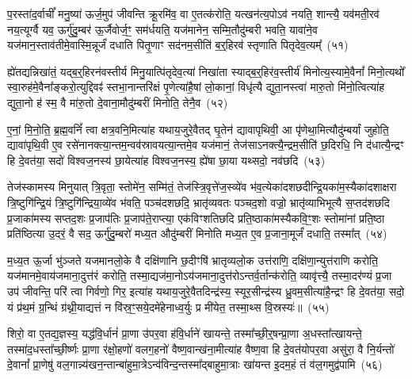 प॒रस्ता॑द॒र्वाचीं᳚ मनु॒ष्या॑ ऊर्ज॒मुप॑ जीवन्ति क्रू॒रमि॑व॒ वा ए॒तत्क॑रोति॒ यत्खन॑त्य॒पो\-ऽव॑ नयति॒ शान्त्यै॒ यव॑मती॒रव॑ नय॒त्यूर्ग्वै यव॒ ऊर्गु॑दु॒म्बर॑ ऊ॒र्जैवोर्ज॒ꣳ॒ सम॑र्धयति॒ यज॑मानेन॒ सम्मि॒तौदु॑म्बरी भवति॒ यावा॑ने॒व यज॑मान॒स्ताव॑तीमे॒वास्मि॒न्नूर्जं॑ दधाति पितृ॒णाꣳ सद॑नम॒सीति॑ ब॒र्॒\mbox{}हिरव॑ स्तृणाति पितृदेव॒त्यम्᳚~(५१)\ip

ह्ये॑तद्यन्निखा॑तं॒ यद्ब॒र्॒\mbox{}हिरन॑वस्तीर्य मिनु॒यात्पि॑तृदेव॒त्या॑ निखा॑ता स्याद्ब॒र्॒\mbox{}हिर॑व॒स्तीर्य॑ मिनोत्य॒स्यामे॒वैनां᳚ मिनो॒त्यथो᳚ स्वा॒रुह॑मे॒वैना᳚ङ्करो॒त्युद्दिवꣴ॑ स्तभा॒नान्तरि॑क्षं पृ॒णेत्या॑है॒षां लो॒कानां॒ विधृ॑त्यै द्युता॒नस्त्वा॑ मारु॒तो मि॑नो॒त्वित्या॑ह द्युता॒नो ह॑ स्म॒ वै मा॑रु॒तो दे॒वाना॒मौदु॑म्बरीं मिनोति॒ तेनै॒व~(५२)\ip

ए॒नां॒ मि॒नो॒ति॒ ब्र॒ह्म॒वनिं᳚ त्वा क्षत्र॒वनि॒मित्या॑ह यथाय॒जुरे॒वैतद् घृ॒तेन॑ द्यावा\-पृथिवी॒ आ पृ॑णेथा॒मित्यौदु॑म्बर्यां जुहोति॒ द्यावा॑\-पृथि॒वी ए॒व रसे॑नानक्त्या॒न्तम॒न्वव॑स्रावयत्या॒न्तमे॒व यज॑मानं॒ तेज॑सा\-ऽनक्त्यै॒न्द्रम॒सीति॑ छ॒दिरधि॒ नि द॑धात्यै॒न्द्रꣳ हि दे॒वत॑या॒ सदो॑ विश्वज॒नस्य॑ छा॒येत्या॑ह विश्वज॒नस्य॒ ह्ये॑षा छा॒या यथ्सदो॒ नव॑छदि~(५३)\ip

तेज॑स्कामस्य मिनुयात् त्रि॒वृता॒ स्तोमे॑न॒ सम्मि॑तं॒ तेज॑स्त्रि॒वृत्\-ते॑ज॒स्व्ये॑व भ॑व॒त्येका॑\-दशछदीन्द्रि॒यका॑म॒स्यैका॑\-दशाक्षरा त्रि॒ष्टुगि॑न्द्रि॒यं त्रि॒ष्टुगि॑न्द्रिया॒व्ये॑व भ॑वति॒ पञ्च॑दशछदि॒ भ्रातृ॑व्यवतः पञ्चद॒शो वज्रो॒ भ्रातृ॑व्याभिभूत्यै स॒प्तद॑शछदि प्र॒जाका॑मस्य सप्तद॒शः प्र॒जा\-प॑तिः प्र॒जा\-प॑ते॒राप्त्या॒ एक॑विꣳशतिछदि प्रति॒ष्ठाका॑मस्यैकवि॒ꣳ॒शः स्तोमा॑नां प्रति॒ष्ठा प्रति॑ष्ठित्या उ॒दरं॒ वै सद॒ ऊर्गु॑दु॒म्बरो॑ मध्य॒त औदु॑म्बरीं मिनोति मध्य॒त ए॒व प्र॒जाना॒मूर्जं॑ दधाति॒ तस्मा᳚त्~(५४)\ip

म॒ध्य॒त ऊ॒र्जा भु॑ञ्जते यजमानलो॒के वै दक्षि॑णानि छ॒दीꣳषि॑ भ्रातृव्यलो॒क उत्त॑राणि॒ दक्षि॑णा॒न्युत्त॑राणि करोति॒ यज॑मानमे॒वाय॑जमाना॒दुत्त॑रं करोति॒ तस्मा॒द्यज॑मा॒नो\-ऽय॑जमाना॒दुत्त॑रो\-ऽन्तर्व॒र्तान्क॑रोति॒ व्यावृ॑त्त्यै॒ तस्मा॒दर॑ण्यं प्र॒जा उप॑ जीवन्ति॒ परि॑ त्वा गिर्वणो॒ गिर॒ इत्या॑ह यथाय॒जुरे॒वैतदिन्द्र॑स्य॒ स्यूर॒सीन्द्र॑स्य ध्रु॒वम॒सीत्या॑है॒न्द्रꣳ हि दे॒वत॑या॒ सदो॒ यं प्र॑थ॒मं ग्र॒न्थिं ग्र॑थ्नी॒याद्यत्तं न वि॑स्र॒ꣳ॒सये॒दमे॑हेनाध्व॒र्युः प्र मी॑येत॒ तस्मा॒थ्स वि॒स्रस्यः॑॥~(५५)\ip

{\anuvakamend[{अप॑हत्यै॒ तस्मा᳚त्पितृदेव॒त्य॑न्तेनै॒व नव॑छदि॒ तस्मा॒थ्सदः॒ पञ्च॑दश च}]}%

शिरो॒ वा ए॒तद्य॒ज्ञस्य॒ यद्ध॑वि॒र्धानं॑ प्रा॒णा उ॑पर॒वा ह॑वि॒र्धाने॑ खायन्ते॒ तस्मा᳚च्छी॒र्॒\mbox{}षन्प्रा॒णा अ॒धस्ता᳚त्खायन्ते॒ तस्मा॑द॒धस्ता᳚च्छी॒र्ष्णः प्रा॒णा र॑क्षो॒हणो॑ वलग॒हनो॑ वैष्ण॒वान्ख॑ना॒मीत्या॑ह वैष्ण॒वा हि दे॒वत॑योपर॒वा असु॑रा॒ वै नि॒र्यन्तो॑ दे॒वानां᳚ प्रा॒णेषु॑ वल॒गान्न्य॑खन॒न्तान्बा॑हुमा॒त्रे\-ऽन्व॑विन्द॒न्तस्मा᳚द्\-बाहुमा॒त्राः खा॑यन्त इ॒दम॒हं तं व॑ल॒गमुद्व॑पामि~(५६)\ip


